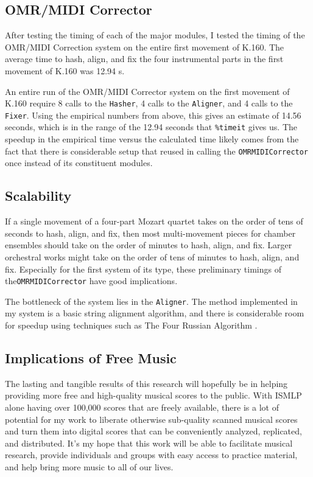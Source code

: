 \subsection{OMR/MIDI Corrector}
After testing the timing of each of the major modules, I tested the timing of the OMR/MIDI Correction system on the entire first movement of K.160. The average time to hash, align, and fix the four instrumental parts in the first movement of K.160 was 12.94 s. 

An entire run of the OMR/MIDI Corrector system on the first movement of K.160 require 8 calls to the \texttt{Hasher}, 4 calls to the \texttt{Aligner}, and 4 calls to the \texttt{Fixer}. Using the empirical numbers from above, this gives an estimate of 14.56 seconds, which is in the range of the 12.94 seconds that \texttt{\%timeit} gives us. The speedup in the empirical time versus the calculated time likely comes from the fact that there is considerable setup that reused in calling the \texttt{OMRMIDICorrector} once instead of its constituent modules. 

\subsection{Scalability}
If a single movement of a four-part Mozart quartet takes on the order of tens of seconds to hash, align, and fix, then most multi-movement pieces for chamber ensembles should take on the order of minutes to hash, align, and fix. Larger orchestral works might take on the order of tens of minutes to hash, align, and fix. Especially for the first system of its type, these preliminary timings of the\texttt{OMRMIDICorrector} have good implications. 

The bottleneck of the system lies in the \texttt{Aligner}. The method implemented in my system is a basic string alignment algorithm, and there is considerable room for speedup using techniques such as The Four Russian Algorithm \cite{seqalign}. 

\subsection{Implications of Free Music}
The lasting and tangible results of this research will hopefully be in helping providing more free and high-quality musical scores to the public. With ISMLP alone having over 100,000 scores that are freely available, there is a lot of potential for my work to liberate otherwise sub-quality scanned musical scores and turn them into digital scores that can be conveniently analyzed, replicated, and distributed. It's my hope that this work will be able to facilitate musical research, provide individuals and groups with easy access to practice material, and help bring more music to all of our lives.
